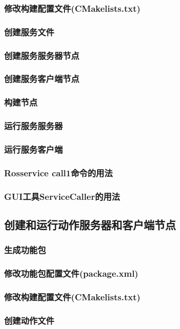 \documentclass[geye,green,kindle,cn]{elegantnote}
\begin{document}
\subsubsection{修改构建配置文件(CMakelists.txt)}
\subsubsection{创建服务文件}
\subsubsection{创建服务服务器节点}
\subsubsection{创建服务客户端节点}
\subsubsection{构建节点}
\subsubsection{运行服务服务器}
\subsubsection{运行服务客户端}
\subsubsection{Rosservice call1命令的用法}
\subsubsection{GUI工具ServiceCaller的用法}
\subsection{创建和运行动作服务器和客户端节点}
\subsubsection{生成功能包}
\subsubsection{修改功能包配置文件(package.xml)}
\subsubsection{修改构建配置文件(CMakelists.txt)}
\subsubsection{创建动作文件}
\end{document}
